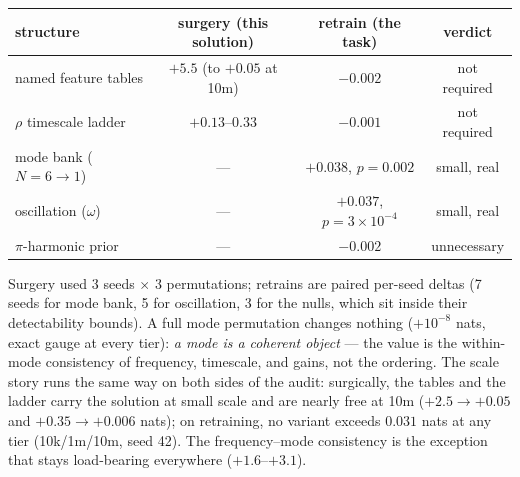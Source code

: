 \documentclass[11pt]{article}
\begin{document}
\begin{center}
\small
\begin{tabular}{lccc}
\toprule
structure & surgery (this solution) & retrain (the task) & verdict \\
\midrule
named feature tables & $+5.5$ (to $+0.05$ at 10m) & $-0.002$ & not required \\
$\rho$ timescale ladder & $+0.13$--$0.33$ & $-0.001$ & not required \\
mode bank ($N{=}6 \to 1$) & --- & $+0.038$, $p=0.002$ & small, real \\
oscillation ($\omega$) & --- & $+0.037$, $p=3{\times}10^{-4}$ & small, real \\
$\pi$-harmonic prior & --- & $-0.002$ & unnecessary \\
\bottomrule
\end{tabular}
\end{center}

Surgery used 3 seeds $\times$ 3 permutations; retrains are paired per-seed
deltas (7 seeds for mode bank, 5 for oscillation, 3 for the nulls, which
sit inside their detectability bounds). A full mode permutation changes
nothing ($+10^{-8}$ nats, exact gauge at every tier): \emph{a mode is a
coherent object} --- the value is the within-mode consistency of
frequency, timescale, and gains, not the ordering. The scale story runs
the same way on both sides of the audit: surgically, the tables and the
ladder carry the solution at small scale and are nearly free at 10m
($+2.5 \to +0.05$ and $+0.35 \to +0.006$ nats); on retraining, no variant
exceeds $0.031$ nats at any tier (10k/1m/10m, seed 42). The
frequency--mode consistency is the exception that stays load-bearing
everywhere ($+1.6$--$+3.1$).
\end{document}
